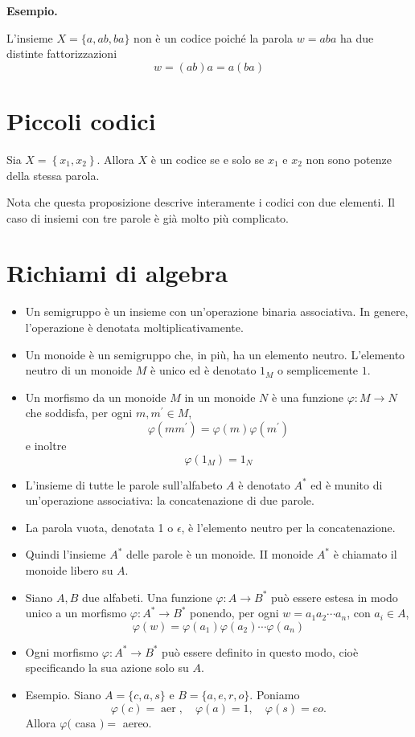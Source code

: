 \textbf{Esempio.}

L'insieme $X=\{a, a b, b a\}$ non è un codice poiché la parola $w=a b a$ ha due distinte fattorizzazioni
$$
w=(a b) a=a(b a)
$$

\section{Piccoli codici}

Sia $X=\left\{x_{1}, x_{2}\right\} .$ Allora $X$ è un codice se e solo se $x_{1}$ e $x_{2}$ non sono potenze della stessa parola.


Nota che questa proposizione descrive interamente i codici con due elementi. Il caso di insiemi con tre parole è già molto più complicato.

\section{Richiami di algebra}
\begin{itemize}
    \item Un semigruppo è un insieme con un'operazione binaria associativa. In genere, l'operazione è denotata moltiplicativamente.
    \item Un monoide è un semigruppo che, in più, ha un elemento neutro. L'elemento neutro di un monoide $M$ è unico ed è denotato $1_{M}$ o semplicemente $1 .$
    \item Un morfismo da un monoide $M$ in un monoide $N$ è una funzione $\varphi: M \rightarrow N$ che soddisfa, per ogni $m, m^{\prime} \in M$,
$$
\varphi\left(m m^{\prime}\right)=\varphi(m) \varphi\left(m^{\prime}\right)
$$
e inoltre
$$
\varphi\left(1_{M}\right)=1_{N}
$$

    \item L'insieme di tutte le parole sull'alfabeto $A$ è denotato $A^{*}$ ed è munito di un'operazione associativa: la concatenazione di due parole.
    \item  La parola vuota, denotata 1 o $\epsilon$, è l'elemento neutro per la concatenazione.
    \item Quindi l'insieme $A^{*}$ delle parole è un monoide. II monoide $A^{*}$ è chiamato il monoide libero su $A$.
    \item Siano $A, B$ due alfabeti. Una funzione $\varphi: A \rightarrow B^{*}$ può essere estesa in modo unico a un morfismo $\varphi: A^{*} \rightarrow B^{*}$ ponendo, per ogni $w=a_{1} a_{2} \cdots a_{n}$, con $a_{i} \in A$,
$$
\varphi(w)=\varphi\left(a_{1}\right) \varphi\left(a_{2}\right) \cdots \varphi\left(a_{n}\right)
$$
    \item Ogni morfismo $\varphi: A^{*} \rightarrow B^{*}$ può essere definito in questo modo, cioè specificando la sua azione solo su $A$.
    \item Esempio. Siano $A=\{c, a, s\}$ e $B=\{a, e, r, o\}$. Poniamo
$$
\varphi(c)=\operatorname{aer}, \quad \varphi(a)=1, \quad \varphi(s)=e o .
$$
Allora $\varphi($ casa $)=$ aereo.

\end{itemize}


